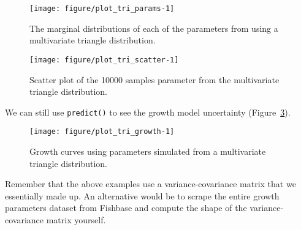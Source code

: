 \documentclass[a4paper,english,10pt]{article}\usepackage[]{graphicx}\usepackage[]{color}
\makeatletter
\def\maxwidth{ %
  \ifdim\Gin@nat@width>\linewidth
    \linewidth
  \else
    \Gin@nat@width
  \fi
}
\newenvironment{knitrout}{}{} %
\newcommand{\code}[1]{{\texttt{#1}}}
\makeatother
\begin{document}
\begin{knitrout}
\color{fgcolor}\begin{figure}[H]

{\centering \texttt{[image: figure/plot\_tri\_params-1]} 

}

\caption[The marginal distributions of each of the parameters from using a multivariate triangle distribution]{The marginal distributions of each of the parameters from using a multivariate triangle distribution.\label{fig:plot_tri_params}}
\end{figure}


\end{knitrout}

\begin{knitrout}
\color{fgcolor}\begin{figure}[H]

{\centering \texttt{[image: figure/plot\_tri\_scatter-1]} 

}

\caption[Scatter plot of the 10000 samples parameter from the multivariate triangle distribution]{Scatter plot of the 10000 samples parameter from the multivariate triangle distribution.\label{fig:plot_tri_scatter}}
\end{figure}


\end{knitrout}

We can still use \code{predict()} to see the growth model uncertainty (Figure~\ref{fig:plot_tri_growth}).

\begin{knitrout}
\color{fgcolor}\begin{figure}[H]

{\centering \texttt{[image: figure/plot\_tri\_growth-1]} 

}

\caption[Growth curves using parameters simulated from a multivariate triangle distribution]{Growth curves using parameters simulated from a multivariate triangle distribution.\label{fig:plot_tri_growth}}
\end{figure}


\end{knitrout}

Remember that the above examples use a variance-covariance matrix that we essentially made up. An alternative would be to scrape the entire growth parameters dataset from Fishbase and compute the shape of the variance-covariance matrix yourself.
\end{document}
